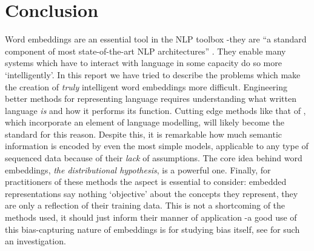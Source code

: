 \documentclass{ucetd}
\begin{document}
\chapter*{Conclusion}\label{chap:conclusion}\label{conclusion}
Word embeddings are an essential tool in the NLP toolbox -they are ``a standard component of most state-of-the-art NLP architectures'' \parencite{peters18-deep-contex-word-repres}. They enable many systems which have to interact with language in some capacity do so more `intelligently'. In this report we have tried to describe the problems which make the creation of \emph{truly} intelligent word embeddings more difficult. Engineering better methods for representing language requires understanding what written language \emph{is} and how it performs its function. Cutting edge methods like that of \textcite{devlin-etal-2019-bert}, which incorporate an element of language modelling, will likely become the standard for this reason. Despite this, it is remarkable how much semantic information is encoded by even the most simple models, applicable to any type of sequenced data because of their \emph{lack} of assumptions. The core idea behind word embeddings, \emph{the distributional hypothesis}, is a powerful one. Finally, for practitioners of these methods the  aspect is essential to consider: embedded representations say nothing `objective' about the concepts they represent, they are only a reflection of their training data. This is not a shortcoming of the methods used, it should just inform their manner of application -a good use of this bias-capturing nature of embeddings is for studying bias itself, see \parencite{garg-2018-word-embeddings-quantify} for such an investigation.

\makebibliography
\end{document}
